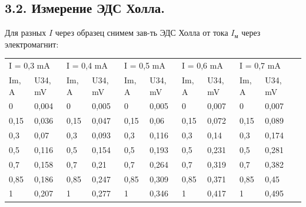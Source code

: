 \documentclass[a4paper,12pt]{article}
\begin{document}
\subsection*{3.2. Измерение ЭДС Холла.}

Для разных $ I $ через образец снимем зав-ть ЭДС Холла от тока $ I_\text{м} $ через электромагнит:

\begin{table}[!ht]
\centering
\begin{tabular}{|ll|ll|ll|ll|ll|l}
\cline{1-10}
\multicolumn{2}{|l|}{I = 0,3 mA}      & \multicolumn{2}{l|}{I = 0,4 mA}      & \multicolumn{2}{l|}{I = 0,5 mA}      & \multicolumn{2}{l|}{I = 0,6 mA}      & \multicolumn{2}{l|}{I = 0,7 mA}      &  \\ \cline{1-10}
\multicolumn{1}{|l|}{Im, A} & U34, mV & \multicolumn{1}{l|}{Im, A} & U34, mV & \multicolumn{1}{l|}{Im, A} & U34, mV & \multicolumn{1}{l|}{Im, A} & U34, mV & \multicolumn{1}{l|}{Im, A} & U34, mV &  \\ \cline{1-10}
\multicolumn{1}{|l|}{0}     & 0,004   & \multicolumn{1}{l|}{0}     & 0,005   & \multicolumn{1}{l|}{0}     & 0,005   & \multicolumn{1}{l|}{0}     & 0,007   & \multicolumn{1}{l|}{0}     & 0,007   &  \\ \cline{1-10}
\multicolumn{1}{|l|}{0,15}  & 0,036   & \multicolumn{1}{l|}{0,15}  & 0,047   & \multicolumn{1}{l|}{0,15}  & 0,06    & \multicolumn{1}{l|}{0,15}  & 0,072   & \multicolumn{1}{l|}{0,15}  & 0,089   &  \\ \cline{1-10}
\multicolumn{1}{|l|}{0,3}   & 0,07    & \multicolumn{1}{l|}{0,3}   & 0,093   & \multicolumn{1}{l|}{0,3}   & 0,116   & \multicolumn{1}{l|}{0,3}   & 0,14    & \multicolumn{1}{l|}{0,3}   & 0,174   &  \\ \cline{1-10}
\multicolumn{1}{|l|}{0,5}   & 0,116   & \multicolumn{1}{l|}{0,5}   & 0,154   & \multicolumn{1}{l|}{0,5}   & 0,193   & \multicolumn{1}{l|}{0,5}   & 0,231   & \multicolumn{1}{l|}{0,5}   & 0,281   &  \\ \cline{1-10}
\multicolumn{1}{|l|}{0,7}   & 0,158   & \multicolumn{1}{l|}{0,7}   & 0,21    & \multicolumn{1}{l|}{0,7}   & 0,264   & \multicolumn{1}{l|}{0,7}   & 0,319   & \multicolumn{1}{l|}{0,7}   & 0,382   &  \\ \cline{1-10}
\multicolumn{1}{|l|}{0,85}  & 0,186   & \multicolumn{1}{l|}{0,85}  & 0,247   & \multicolumn{1}{l|}{0,85}  & 0,309   & \multicolumn{1}{l|}{0,85}  & 0,371   & \multicolumn{1}{l|}{0,85}  & 0,45    &  \\ \cline{1-10}
\multicolumn{1}{|l|}{1}     & 0,207   & \multicolumn{1}{l|}{1}     & 0,277   & \multicolumn{1}{l|}{1}     & 0,346   & \multicolumn{1}{l|}{1}     & 0,417   & \multicolumn{1}{l|}{1}     & 0,495   &  \\ \cline{1-10}

\end{tabular}
\end{table}
\end{document}
